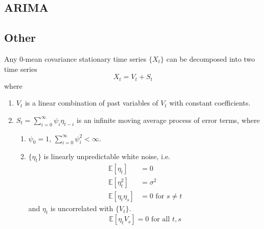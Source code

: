 \documentclass{article}
\begin{document}
  \subsection{ARIMA}

  \subsection{Other}

    \begin{theorem}
      Any $0$-mean covariance stationary time series $\{X_t\}$ can be decomposed into two time series 
      \begin{equation}
        X_t = V_t + S_t
      \end{equation}
      where 
      \begin{enumerate}
        \item $V_t$ is a linear combination of past variables of $V_t$ with constant coefficients. 
        \item $S_t = \sum_{i=0}^\infty \psi_i \eta_{t-i}$ is an infinite moving average process of error terms, where 
          \begin{enumerate}
            \item $\psi_0 = 1$, $\sum_{i=0}^\infty \psi_i^2 < \infty$. 
            \item $\{\eta_t\}$ is linearly unpredictable white noise, i.e. 
              \begin{align}
                \mathbb{E}[\eta_t] & = 0 \\
                \mathbb{E}[\eta_t^2] & = \sigma^2 \\
                \mathbb{E}[\eta_t \eta_s] & = 0 \text{ for } s \neq t 
              \end{align}
              and $\eta_t$ is uncorrelated with $\{V_t\}$.  
              \begin{equation}
                \mathbb{E}[\eta_t V_s] = 0 \text{ for all } t, s
              \end{equation}
          \end{enumerate}
      \end{enumerate}
    \end{theorem}
\end{document}
